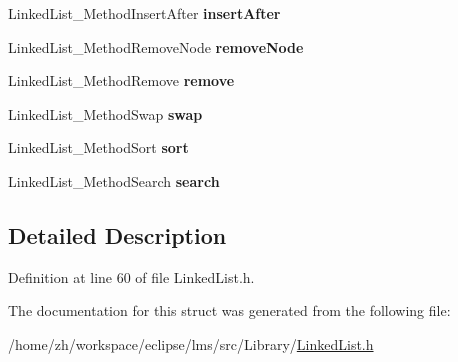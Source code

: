 \begin{DoxyCompactItemize}
\item 
\hypertarget{structLinkedList__Methods_ae2b2cefbf807ed324a502d053e14e0b7}{Linked\-List\-\_\-\-Method\-Insert\-After {\bfseries insert\-After}}\label{structLinkedList__Methods_ae2b2cefbf807ed324a502d053e14e0b7}

\item 
\hypertarget{structLinkedList__Methods_affe091d6991faa27ec46dfd6b65b52f2}{Linked\-List\-\_\-\-Method\-Remove\-Node {\bfseries remove\-Node}}\label{structLinkedList__Methods_affe091d6991faa27ec46dfd6b65b52f2}

\item 
\hypertarget{structLinkedList__Methods_afe4cb747d761166a9cb44c7ff7521112}{Linked\-List\-\_\-\-Method\-Remove {\bfseries remove}}\label{structLinkedList__Methods_afe4cb747d761166a9cb44c7ff7521112}

\item 
\hypertarget{structLinkedList__Methods_a77e1745d83fb3a5af68bb3432ad7c2a8}{Linked\-List\-\_\-\-Method\-Swap {\bfseries swap}}\label{structLinkedList__Methods_a77e1745d83fb3a5af68bb3432ad7c2a8}

\item 
\hypertarget{structLinkedList__Methods_a73064231a74d7a4454858f45508c801a}{Linked\-List\-\_\-\-Method\-Sort {\bfseries sort}}\label{structLinkedList__Methods_a73064231a74d7a4454858f45508c801a}

\item 
\hypertarget{structLinkedList__Methods_a6f1fe15affac9e95c4e1126e52870c07}{Linked\-List\-\_\-\-Method\-Search {\bfseries search}}\label{structLinkedList__Methods_a6f1fe15affac9e95c4e1126e52870c07}

\end{DoxyCompactItemize}


\subsection{Detailed Description}


Definition at line 60 of file Linked\-List.\-h.



The documentation for this struct was generated from the following file\-:\begin{DoxyCompactItemize}
\item 
/home/zh/workspace/eclipse/lms/src/\-Library/\hyperlink{LinkedList_8h}{Linked\-List.\-h}\end{DoxyCompactItemize}
